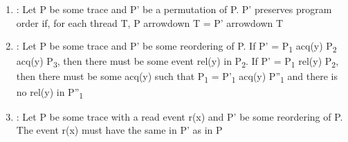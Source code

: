 \documentclass[landscape, a4paper]{article}
\begin{document}
\begin{minipage}[t]{0.19\linewidth}
\begin{enumerate}
		\item {}: Let P be some trace and P' be a permutation of P. P' preserves program order if, for each thread T, P arrowdown T = P' arrowdown T
		\item {}: Let P be some trace and P' be some reordering of P. If P' = P\textsubscript{1} acq(y) P\textsubscript{2} acq(y) P\textsubscript{3}, then there must be some event rel(y) in P\textsubscript{2}. If P' = P\textsubscript{1} rel(y) P\textsubscript{2}, then there must be some acq(y) such that P\textsubscript{1} = P'\textsubscript{1} acq(y) P''\textsubscript{1} and there is no rel(y) in P''\textsubscript{1}
		\item {}: Let P be some trace with a read event r(x) and P' be some reordering of P. The event r(x) must have the same  in P' as in P
	\end{enumerate}
\end{minipage}
\end{document}
